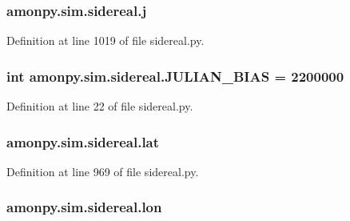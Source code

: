 \hypertarget{namespaceamonpy_1_1sim_1_1sidereal_acada5fbb9f626863280f6d2ed180cae0}{
\subsubsection[{j}]{\setlength{\rightskip}{0pt plus 5cm}amonpy.\-sim.\-sidereal.\-j}}\label{namespaceamonpy_1_1sim_1_1sidereal_acada5fbb9f626863280f6d2ed180cae0}


Definition at line 1019 of file sidereal.\-py.

\hypertarget{namespaceamonpy_1_1sim_1_1sidereal_ac5d3d76ef51676c5080775d472d67a98}{
\subsubsection[{J\-U\-L\-I\-A\-N\-\_\-\-B\-I\-A\-S}]{\setlength{\rightskip}{0pt plus 5cm}int amonpy.\-sim.\-sidereal.\-J\-U\-L\-I\-A\-N\-\_\-\-B\-I\-A\-S = 2200000}}\label{namespaceamonpy_1_1sim_1_1sidereal_ac5d3d76ef51676c5080775d472d67a98}


Definition at line 22 of file sidereal.\-py.

\hypertarget{namespaceamonpy_1_1sim_1_1sidereal_ac080650ce6d42cba0dd39366ed428779}{
\subsubsection[{lat}]{\setlength{\rightskip}{0pt plus 5cm}amonpy.\-sim.\-sidereal.\-lat}}\label{namespaceamonpy_1_1sim_1_1sidereal_ac080650ce6d42cba0dd39366ed428779}


Definition at line 969 of file sidereal.\-py.

\hypertarget{namespaceamonpy_1_1sim_1_1sidereal_acd876ff43fec30cffbf0b1df441599d0}{
\subsubsection[{lon}]{\setlength{\rightskip}{0pt plus 5cm}amonpy.\-sim.\-sidereal.\-lon}}\label{namespaceamonpy_1_1sim_1_1sidereal_acd876ff43fec30cffbf0b1df441599d0}


